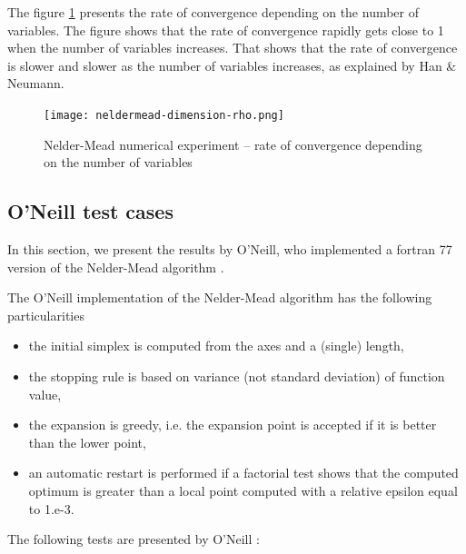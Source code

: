 The figure \ref{fig-nm-numexp3-rho} presents the rate of convergence 
depending on the number of variables. The figure shows that 
the rate of convergence rapidly gets close to 1 when the number 
of variables increases. That shows that the rate of convergence 
is slower and slower as the number of variables increases, as 
explained by Han \& Neumann.

\begin{figure}
\begin{center}
\texttt{[image: neldermead-dimension-rho.png]}
\end{center}
\caption{Nelder-Mead numerical experiment -- rate of convergence 
depending on the number of variables}
\label{fig-nm-numexp3-rho}
\end{figure}

\subsection{O'Neill test cases}

In this section, we present the results by O'Neill, who 
implemented a fortran 77 version of the Nelder-Mead algorithm
\cite{O'Neill1971AAF}.

The O'Neill implementation of the Nelder-Mead algorithm has the following 
particularities 
\begin{itemize}
\item the initial simplex is computed from the axes and a (single) length,
\item the stopping rule is based on variance (not standard deviation) of function value,
\item the expansion is greedy, i.e. the expansion point is accepted if it is better than the lower point,
\item an automatic restart is performed if a factorial test shows that the 
computed optimum is greater than a local point computed with a relative 
epsilon equal to 1.e-3.
\end{itemize}

The following tests are presented by O'Neill :

